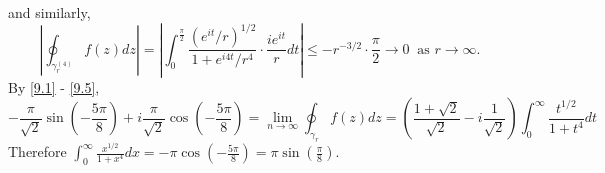 \documentclass[12pt]{article}
\begin{document}
and similarly,
\begin{equation}
\left|\oint_{\gamma_{r}^{(4)}}f(z)dz\right| = \left|\int_{0}^{\frac{\pi}{2}}\frac{(e^{it}/r)^{1/2}}{1 + e^{i4t}/r^{4}}\cdot \frac{ie^{it}}{r}dt\right|
\leq -r^{-3/2} \cdot \frac{\pi}{2} \rightarrow 0 \ \text{ as } r\rightarrow \infty.
\label{9.5}
\end{equation}
By \eqref{9.1} - \eqref{9.5},
\[ -\frac{\pi}{\sqrt{2}}\sin\left( -\frac{5\pi}{8} \right) + i\frac{\pi}{\sqrt{2}}\cos\left( -\frac{5\pi}{8} \right) = 
\lim_{n\rightarrow \infty}\oint_{\gamma_{r}}f(z)dz = 
\left(\frac{1 + \sqrt{2}}{\sqrt{2}} -i\frac{1}{\sqrt{2}}\right)\int_{0}^{\infty}\frac{t^{1/2}}{1 + t^{4}}dt \]
Therefore $\int_{0}^{\infty}\frac{x^{1/2}}{1 + x^{4}}dx = - \pi \cos \left( -\frac{5\pi}{8} \right) = \pi \sin\left( \frac{\pi}{8} \right)$.



\newpage
\end{document}
